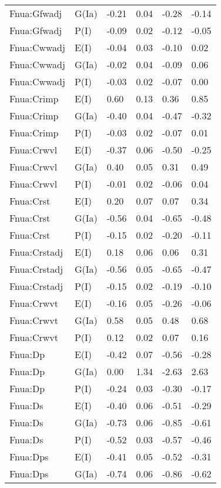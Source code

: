 \begin{center}
\begin{longtable}{|p{1.1in}|p{0.7in}|p{0.7in}|p{0.6in}|p{0.6in}|p{0.6in}|}
  Fnua:Gfwadj & G(Ia) & -0.21 & 0.04 & -0.28 & -0.14 \\ 
  Fnua:Gfwadj & P(I) & -0.09 & 0.02 & -0.12 & -0.05 \\ 
  Fnua:Cwwadj & E(I) & -0.04 & 0.03 & -0.10 & 0.02 \\ 
  Fnua:Cwwadj & G(Ia) & -0.02 & 0.04 & -0.09 & 0.06 \\ 
  Fnua:Cwwadj & P(I) & -0.03 & 0.02 & -0.07 & 0.00 \\ 
  Fnua:Crimp & E(I) & 0.60 & 0.13 & 0.36 & 0.85 \\ 
  Fnua:Crimp & G(Ia) & -0.40 & 0.04 & -0.47 & -0.32 \\ 
  Fnua:Crimp & P(I) & -0.03 & 0.02 & -0.07 & 0.01 \\ 
  Fnua:Crwvl & E(I) & -0.37 & 0.06 & -0.50 & -0.25 \\ 
  Fnua:Crwvl & G(Ia) & 0.40 & 0.05 & 0.31 & 0.49 \\ 
  Fnua:Crwvl & P(I) & -0.01 & 0.02 & -0.06 & 0.04 \\ 
  Fnua:Crst & E(I) & 0.20 & 0.07 & 0.07 & 0.34 \\ 
  Fnua:Crst & G(Ia) & -0.56 & 0.04 & -0.65 & -0.48 \\ 
  Fnua:Crst & P(I) & -0.15 & 0.02 & -0.20 & -0.11 \\ 
  Fnua:Crstadj & E(I) & 0.18 & 0.06 & 0.06 & 0.31 \\ 
  Fnua:Crstadj & G(Ia) & -0.56 & 0.05 & -0.65 & -0.47 \\ 
  Fnua:Crstadj & P(I) & -0.15 & 0.02 & -0.19 & -0.10 \\ 
  Fnua:Crwvt & E(I) & -0.16 & 0.05 & -0.26 & -0.06 \\ 
  Fnua:Crwvt & G(Ia) & 0.58 & 0.05 & 0.48 & 0.68 \\ 
  Fnua:Crwvt & P(I) & 0.12 & 0.02 & 0.07 & 0.16 \\ 
  Fnua:Dp & E(I) & -0.42 & 0.07 & -0.56 & -0.28 \\ 
  Fnua:Dp & G(Ia) & 0.00 & 1.34 & -2.63 & 2.63 \\ 
  Fnua:Dp & P(I) & -0.24 & 0.03 & -0.30 & -0.17 \\ 
  Fnua:Ds & E(I) & -0.40 & 0.06 & -0.51 & -0.29 \\ 
  Fnua:Ds & G(Ia) & -0.73 & 0.06 & -0.85 & -0.61 \\ 
  Fnua:Ds & P(I) & -0.52 & 0.03 & -0.57 & -0.46 \\ 
  Fnua:Dps & E(I) & -0.41 & 0.05 & -0.52 & -0.31 \\ 
  Fnua:Dps & G(Ia) & -0.74 & 0.06 & -0.86 & -0.62 \\ 

\end{longtable}
\end{center}
